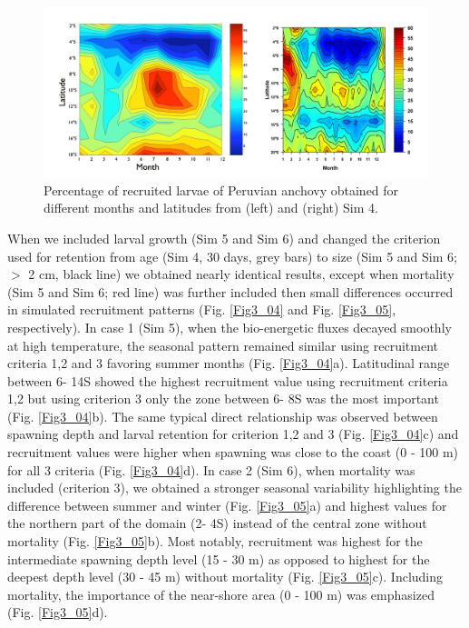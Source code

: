\begin{figure}[ht]
	\includegraphics[width=1.0\textwidth]{figures/Fig3_03S.png}
	\centering
	\caption{Percentage of recruited larvae of Peruvian anchovy obtained for different months and latitudes from (left) \cite{BrocLett2008} and (right) Sim 4.}
	\label{Fig3_03S}
\end{figure}

When we included larval growth (Sim 5 and Sim 6) and changed the criterion used for retention from age (Sim 4, 30 days, grey bars) to size (Sim 5 and Sim 6; $>$ 2 cm, black line) we obtained nearly identical results, except when mortality (Sim 5 and Sim 6; red line) was further included then small differences occurred in simulated recruitment patterns (Fig. \ref{Fig3_04} and Fig. \ref{Fig3_05}, respectively). In case 1 (Sim 5), when the bio-energetic fluxes decayed smoothly at high temperature, the seasonal pattern remained similar using recruitment criteria 1,2 and 3 favoring summer months (Fig. \ref{Fig3_04}a). Latitudinal range between 6\textdegree - 14\textdegree S showed the highest recruitment value using recruitment criteria 1,2 but using criterion 3 only the zone between 6\textdegree - 8\textdegree S was the most important (Fig. \ref{Fig3_04}b). The same typical direct relationship was observed between spawning depth and larval retention for criterion 1,2 and 3 (Fig. \ref{Fig3_04}c) and recruitment values were higher when spawning was close to the coast (0 - 100 m) for all 3 criteria (Fig. \ref{Fig3_04}d). In case 2 (Sim 6), when mortality was included (criterion 3), we obtained a stronger seasonal variability highlighting the difference between summer and winter (Fig. \ref{Fig3_05}a) and highest values for the northern part of the domain (2\textdegree - 4\textdegree S) instead of the central zone without mortality (Fig. \ref{Fig3_05}b). Most notably, recruitment was highest for the intermediate spawning depth level (15 - 30 m) as opposed to highest for the deepest depth level (30 - 45 m) without mortality (Fig. \ref{Fig3_05}c). Including mortality, the importance of the near-shore area (0 - 100 m) was emphasized (Fig. \ref{Fig3_05}d).\\

